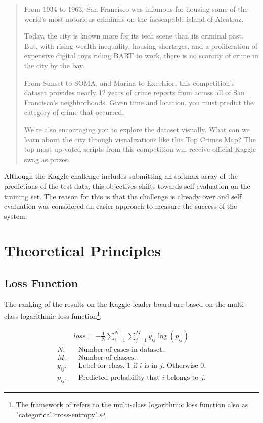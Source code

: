 \documentclass[12pt,a4paper]{scrartcl}
\begin{document}
\begin{quote}
From 1934 to 1963, San Francisco was infamous for housing some of the world's most notorious criminals on the inescapable island of Alcatraz.

Today, the city is known more for its tech scene than its criminal past. But, with rising wealth inequality, housing shortages, and a proliferation of expensive digital toys riding BART to work, there is no scarcity of crime in the city by the bay.

From Sunset to SOMA, and Marina to Excelsior, this competition's dataset provides nearly 12 years of crime reports from across all of San Francisco's neighborhoods. Given time and location, you must predict the category of crime that occurred.

We're also encouraging you to explore the dataset visually. What can we learn about the city through visualizations like this Top Crimes Map? The top most up-voted scripts from this competition will receive official Kaggle swag as prizes. 
\end{quote}

Although the Kaggle challenge includes submitting an softmax array of the predictions of the test data, this objectives shifts towards self evaluation on the training set. The reason for this is that the challenge is already over and self evaluation was considered an easier approach to measure the success of the system.

\pagebreak
\section{Theoretical Principles}\label{s:theoretical_principles}
\subsection{Loss Function}\label{ss:loss_function}
The ranking of the results on the Kaggle leader board\citep{kgl_sf_crime} are based on the multi-class logarithmic loss function\footnote{The framework of \cite{keras} refers to the multi-class logarithmic loss function also as "categorical cross-entropy".}:

\begin{align}\label{eqn:loss}
&loss = -\frac1N\sum_{i=1}^N\sum_{j=1}^My_{ij}\log\left(p_{ij}\right)\\
\nonumber
N: & \hspace{8pt} \textrm{Number of cases in dataset.}\\
\nonumber
M: & \hspace{8pt} \textrm{Number of classes.}\\
\nonumber
y_{ij}: & \hspace{8pt} \textrm{Label for class. 1 if $i$ is in $j$. Otherwise 0.}\\
\nonumber
p_{ij}: & \hspace{8pt} \textrm{Predicted probability that $i$ belongs to $j$.}
\end{align}
\end{document}
